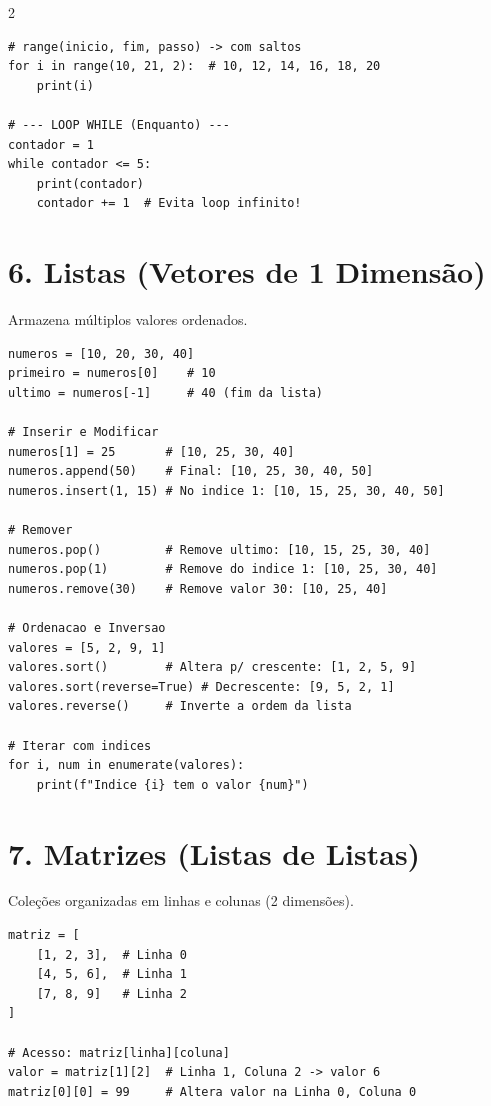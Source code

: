 \documentclass[10pt,a4paper]{article}
\begin{document}
\begin{multicols}{2}
\begin{minipage}{\linewidth}
\begin{lstlisting}
# range(inicio, fim, passo) -> com saltos
for i in range(10, 21, 2):  # 10, 12, 14, 16, 18, 20
    print(i)

# --- LOOP WHILE (Enquanto) ---
contador = 1
while contador <= 5:
    print(contador)
    contador += 1  # Evita loop infinito!
\end{lstlisting}
\end{minipage}
\vspace{0.4cm}

\noindent
\begin{minipage}{\linewidth}
\section*{6. Listas (Vetores de 1 Dimensão)}
Armazena múltiplos valores ordenados.
\begin{lstlisting}
numeros = [10, 20, 30, 40]
primeiro = numeros[0]    # 10
ultimo = numeros[-1]     # 40 (fim da lista)

# Inserir e Modificar
numeros[1] = 25       # [10, 25, 30, 40]
numeros.append(50)    # Final: [10, 25, 30, 40, 50]
numeros.insert(1, 15) # No indice 1: [10, 15, 25, 30, 40, 50]

# Remover
numeros.pop()         # Remove ultimo: [10, 15, 25, 30, 40]
numeros.pop(1)        # Remove do indice 1: [10, 25, 30, 40]
numeros.remove(30)    # Remove valor 30: [10, 25, 40]

# Ordenacao e Inversao
valores = [5, 2, 9, 1]
valores.sort()        # Altera p/ crescente: [1, 2, 5, 9]
valores.sort(reverse=True) # Decrescente: [9, 5, 2, 1]
valores.reverse()     # Inverte a ordem da lista

# Iterar com indices
for i, num in enumerate(valores):
    print(f"Indice {i} tem o valor {num}")
\end{lstlisting}
\end{minipage}
\vspace{0.4cm}

\noindent
\begin{minipage}{\linewidth}
\section*{7. Matrizes (Listas de Listas)}
Coleções organizadas em linhas e colunas (2 dimensões).
\begin{lstlisting}
matriz = [
    [1, 2, 3],  # Linha 0
    [4, 5, 6],  # Linha 1
    [7, 8, 9]   # Linha 2
]

# Acesso: matriz[linha][coluna]
valor = matriz[1][2]  # Linha 1, Coluna 2 -> valor 6
matriz[0][0] = 99     # Altera valor na Linha 0, Coluna 0


\end{lstlisting}
\end{minipage}
\end{multicols}
\end{document}
